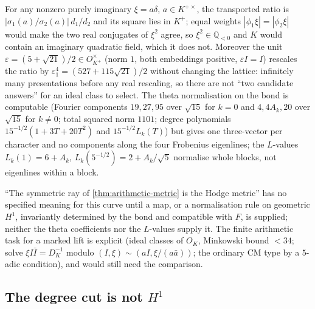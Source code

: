 \begin{proposition}
\label{prop:no-rational-symmetric-marking}
For any nonzero purely imaginary $\xi = a\delta$, $a\in K^{+\times}$, the transported ratio is $|\sigma_1(a)/\sigma_2(a)|\,d_1/d_2$ and its
square lies in $K^+$; equal weights $|\phi_1\xi| = |\phi_2\xi|$ would make the two real conjugates of $\xi^2$ agree, so
$\xi^2\in\mathbb Q_{<0}$ and $K$ would contain an imaginary quadratic field, which it does not. Moreover the unit
$\varepsilon = (5+\sqrt{21})/2\in O_{K^+}^\times$ (norm $1$, both embeddings positive, $\varepsilon I = I$) rescales the ratio by
$\varepsilon_1^4 = (527+115\sqrt{21})/2$ without changing the lattice: infinitely many presentations before any real rescaling, so
there are not ``two candidate answers'' for an ideal class to select. The theta normalisation on the bond is computable
(Fourier components $19,27,95$ over $\sqrt{15}$ for $k = 0$ and $4,4A_k,20$ over $\sqrt{15}$ for $k\ne0$; total squared norm
$1101$; degree polynomials $15^{-1/2}(1+3T+20T^2)$ and $15^{-1/2}L_k(T)$) but gives one three-vector per character and no
components along the four Frobenius eigenlines; the $L$-values $L_k(1) = 6+A_k$, $L_k(5^{-1/2}) = 2+A_k/\sqrt5$ normalise
whole blocks, not eigenlines within a block.
\end{proposition}

\begin{observation}
\label{obs:bond-h1-comparison-open}
``The symmetric ray of \cref{thm:arithmetic-metric} is the Hodge metric'' has no specified meaning for this curve until a
map, or a normalisation rule on geometric $H^1$, invariantly determined by the bond and compatible with $F$, is supplied;
neither the theta coefficients nor the $L$-values supply it. The finite arithmetic task for a marked lift is explicit
(ideal classes of $O_K$, Minkowski bound $<34$; solve $\xi I\bar I = D_K^{-1}$ modulo $(I,\xi)\sim(aI,\xi/(a\bar a))$; the
ordinary CM type by a $5$-adic condition), and would still need the comparison.
\end{observation}

\subsection{The degree cut is not $H^1$}

